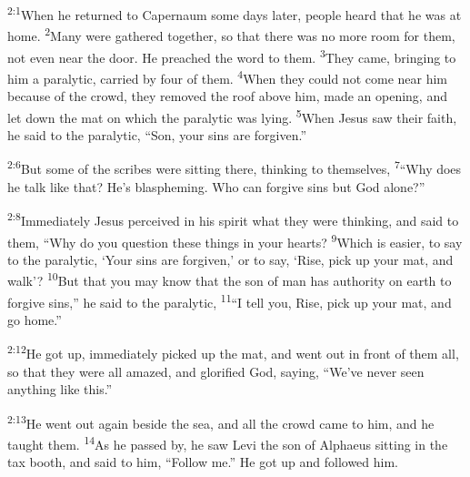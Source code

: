 \documentclass[openany,12pt,english]{book}
\newenvironment{para}{\par\pretolerance=100\tolerance=200\setlength{\emergencystretch}{0.6em}\relax}{\par}
\begin{document}
\begin{para}
    \textsuperscript{2:1}\thinspace{}When he returned to Capernaum some days lat\-er, peo\-ple heard that he was at home.
    \textsuperscript{2}\thinspace{}Man\-y were gathered to\-geth\-er, so that there was no more room for them, not e\-ven near the door. He preached the word to them.
    \textsuperscript{3}\thinspace{}They came, bring\-ing to him a par\-a\-lyt\-ic, car\-ried by four of them.
    \textsuperscript{4}\thinspace{}When they could not come near him be\-cause of the crowd, they re\-moved the roof a\-bove him, made an o\-pen\-ing, and let down the mat on which the par\-a\-lyt\-ic was ly\-ing.
    \textsuperscript{5}\thinspace{}When Jesus saw their faith, he said to the par\-a\-lyt\-ic, “Son, your sins are for\-giv\-en.”
\end{para}

\begin{para}
    \textsuperscript{2:6}\thinspace{}But some of the scribes were sit\-ting there, think\-ing to them\-selves,
    \textsuperscript{7}\thinspace{}“Why does he talk like that? He's blas\-phem\-ing. Who can for\-give sins but God a\-lone?”
\end{para}

\begin{para}
    \textsuperscript{2:8}\thinspace{}Im\-me\-di\-ate\-ly Jesus perceived in his spir\-it what they were think\-ing, and said to them, “Why do you ques\-tion these things in your hearts?
    \textsuperscript{9}\thinspace{}Which is eas\-i\-er, to say to the par\-a\-lyt\-ic, ‘Your sins are for\-giv\-en,’ or to say, ‘Rise, pick up your mat, and walk’?
    \textsuperscript{10}\thinspace{}But that you may know that the son of man has au\-thor\-i\-ty on earth to for\-give sins,” he said to the par\-a\-lyt\-ic,
    \textsuperscript{11}\thinspace{}“I tell you, Rise, pick up your mat, and go home.”
\end{para}

\begin{para}
    \textsuperscript{2:12}\thinspace{}He got up, im\-me\-di\-ate\-ly pick\-ed up the mat, and went out in front of them all, so that they were all a\-mazed, and glo\-ri\-fied God, say\-ing, “We've nev\-er seen any\-thing like this.”
\end{para}

\bigskip{}

\begin{para}
    \textsuperscript{2:13}\thinspace{}He went out a\-gain be\-side the sea, and all the crowd came to him, and he taught them.
    \textsuperscript{14}\thinspace{}As he passed by, he saw Levi the son of Alphaeus sit\-ting in the tax booth, and said to him, “Fol\-low me.” He got up and followed him.
\end{para}
\end{document}
